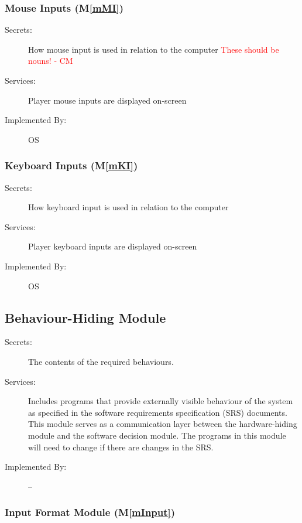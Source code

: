 \documentclass[12pt, titlepage]{article}
\newcommand{\mref}[1]{M\ref{#1}}
\begin{document}
\subsubsection{Mouse Inputs (\mref{mMI})}

\begin{description}
\item[Secrets:] How mouse input is used in relation to the computer \textcolor{red}{These should be nouns! - CM} \\
\item[Services:] Player mouse inputs are displayed on-screen 
\item[Implemented By:] OS
\end{description}

\subsubsection{Keyboard Inputs (\mref{mKI})}

\begin{description}
\item[Secrets:] How keyboard input is used in relation to the computer
\item[Services:] Player keyboard inputs are displayed on-screen 
\item[Implemented By:] OS
\end{description}



\subsection{Behaviour-Hiding Module}

\begin{description}
\item[Secrets:]The contents of the required behaviours.
\item[Services:]Includes programs that provide externally visible behaviour of
  the system as specified in the software requirements specification (SRS)
  documents. This module serves as a communication layer between the
  hardware-hiding module and the software decision module. The programs in this
  module will need to change if there are changes in the SRS.
\item[Implemented By:] --
\end{description}

\subsubsection{Input Format Module (\mref{mInput})}
\end{document}
